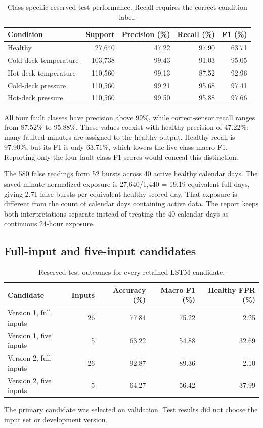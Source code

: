 \begin{table}[htbp]\centering\small
\caption{Class-specific reserved-test performance. Recall requires the correct condition label.}\label{tab:perclass}
\begin{tabularx}{\linewidth}{X r r r r}
\toprule
Condition & Support & Precision (\%) & Recall (\%) & F1 (\%) \\
\midrule
Healthy & 27,640 & 47.22 & 97.90 & 63.71 \\
Cold-deck temperature & 103,738 & 99.43 & 91.03 & 95.05 \\
Hot-deck temperature & 110,560 & 99.13 & 87.52 & 92.96 \\
Cold-deck pressure & 110,560 & 99.21 & 95.68 & 97.41 \\
Hot-deck pressure & 110,560 & 99.50 & 95.88 & 97.66 \\
\bottomrule\end{tabularx}
\end{table}

All four fault classes have precision above 99\%, while correct-sensor recall ranges from 87.52\% to 95.88\%. These values coexist with healthy precision of 47.22\%: many faulted minutes are assigned to the healthy output. Healthy recall is 97.90\%, but its F1 is only 63.71\%, which lowers the five-class macro F1. Reporting only the four fault-class F1 scores would conceal this distinction.

The 580 false readings form 52 bursts across 40 active healthy calendar days. The saved minute-normalized exposure is 27,640/1,440 = 19.19 equivalent full days, giving 2.71 false bursts per equivalent healthy scored day. That exposure is different from the count of calendar days containing active data. The report keeps both interpretations separate instead of treating the 40 calendar days as continuous 24-hour exposure.

\subsection{Full-input and five-input candidates}

\begin{table}[htbp]\centering\small
\caption{Reserved-test outcomes for every retained LSTM candidate.}\label{tab:candidates}
\begin{tabularx}{\linewidth}{X r r r r}
\toprule
Candidate & Inputs & Accuracy (\%) & Macro F1 (\%) & Healthy FPR (\%) \\
\midrule
Version 1, full inputs & 26 & 77.84 & 75.22 & 2.25 \\
Version 1, five inputs & 5 & 63.22 & 54.88 & 32.69 \\
Version 2, full inputs & 26 & 92.87 & 89.36 & 2.10 \\
Version 2, five inputs & 5 & 64.27 & 56.42 & 37.99 \\
\bottomrule\end{tabularx}
\par\smallskip\footnotesize The primary candidate was selected on validation. Test results did not choose the input set or development version.
\end{table}

